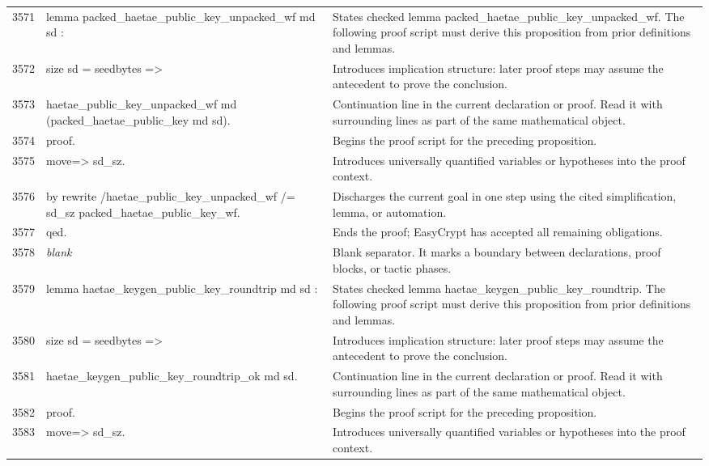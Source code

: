\documentclass[10pt]{article}
\begin{document}
\begin{longtable}{r L{0.53\textwidth} L{0.37\textwidth}}
3571 & {\ttfamily\scriptsize lemma packed\_haetae\_public\_key\_unpacked\_wf md sd :} & States checked lemma packed\_haetae\_public\_key\_unpacked\_wf.  The following proof script must derive this proposition from prior definitions and lemmas. \\
3572 & {\ttfamily\scriptsize   size sd = seedbytes =>} & Introduces implication structure: later proof steps may assume the antecedent to prove the conclusion. \\
3573 & {\ttfamily\scriptsize   haetae\_public\_key\_unpacked\_wf md (packed\_haetae\_public\_key md sd).} & Continuation line in the current declaration or proof.  Read it with surrounding lines as part of the same mathematical object. \\
3574 & {\ttfamily\scriptsize proof.} & Begins the proof script for the preceding proposition. \\
3575 & {\ttfamily\scriptsize move=> sd\_sz.} & Introduces universally quantified variables or hypotheses into the proof context. \\
3576 & {\ttfamily\scriptsize by rewrite /haetae\_public\_key\_unpacked\_wf /= sd\_sz packed\_haetae\_public\_key\_wf.} & Discharges the current goal in one step using the cited simplification, lemma, or automation. \\
3577 & {\ttfamily\scriptsize qed.} & Ends the proof; EasyCrypt has accepted all remaining obligations. \\
3578 & {\ttfamily\scriptsize \emph{blank}} & Blank separator.  It marks a boundary between declarations, proof blocks, or tactic phases. \\
3579 & {\ttfamily\scriptsize lemma haetae\_keygen\_public\_key\_roundtrip md sd :} & States checked lemma haetae\_keygen\_public\_key\_roundtrip.  The following proof script must derive this proposition from prior definitions and lemmas. \\
3580 & {\ttfamily\scriptsize   size sd = seedbytes =>} & Introduces implication structure: later proof steps may assume the antecedent to prove the conclusion. \\
3581 & {\ttfamily\scriptsize   haetae\_keygen\_public\_key\_roundtrip\_ok md sd.} & Continuation line in the current declaration or proof.  Read it with surrounding lines as part of the same mathematical object. \\
3582 & {\ttfamily\scriptsize proof.} & Begins the proof script for the preceding proposition. \\
3583 & {\ttfamily\scriptsize move=> sd\_sz.} & Introduces universally quantified variables or hypotheses into the proof context. \\

\end{longtable}
\end{document}
